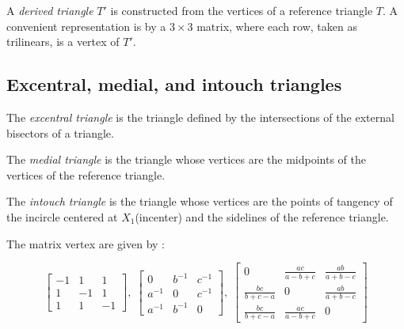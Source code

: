 A {\em derived triangle} $T'$ is constructed from the vertices of  a reference triangle $T$. A convenient representation is by a $3\times  3$  matrix, where each row, taken as trilinears, is a vertex of $T'$.

\subsection{Excentral, medial, and intouch triangles}

The {\em  excentral triangle} is the triangle defined by the intersections of the external bisectors of a triangle.

\noindent The {\em medial triangle} is the triangle whose vertices are the midpoints of the vertices of the reference triangle.

\noindent The {\em intouch triangle}  is the triangle whose vertices are the points of tangency of the  incircle centered at $X_1$(incenter) and the sidelines of the reference triangle.



The matrix vertex are given by \cite{mw}: 



\begin{equation*}
\left[
\begin{matrix}
-1&1&1\\1&-1&1\\1&1&-1
\end{matrix}
\right],\;
\left[
\begin{matrix}
0&b^{-1}&c^{-1}\\a^{-1}&0&c^{-1}\\a^{-1}&b^{-1}&0
\end{matrix}
\right],\;
\left[
\begin{matrix}
0&\frac{a c}{a-b+c}&\frac{a b}{a+b-c}\\
\frac{b c}{ b+c-a}&0&\frac{a b}{a+b-c}\\
\frac{b c}{ b+c-a}&\frac{a c}{a-b+c}&0
\end{matrix}
\right]
\end{equation*}

